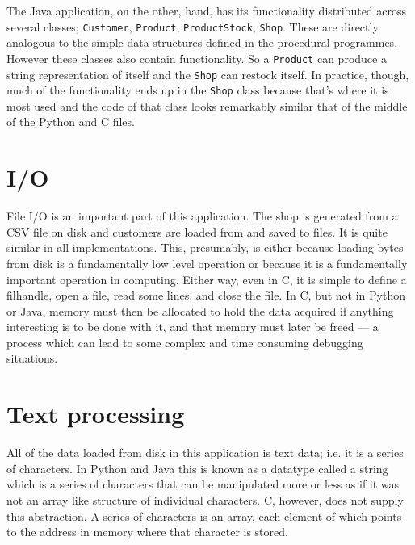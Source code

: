 \documentclass[12pt, a4paper]{article}
\begin{document}
The Java application, on the other, hand, has its functionality distributed across several classes; \texttt{Customer}, \texttt{Product}, \texttt{ProductStock}, \texttt{Shop}. These are directly analogous to the simple data structures defined in the procedural programmes. However these classes also contain functionality. So a \texttt{Product} can produce a string representation of itself and the \texttt{Shop} can restock itself. In practice, though, much of the functionality ends up in the \texttt{Shop} class because that's where it is most used and the code of that class looks remarkably similar that of the middle of the Python and C files.

\section{I/O}

File I/O is an important part of this application. The shop is generated from a CSV file on disk and customers are loaded from and saved to files. It is quite similar in all implementations. This, presumably, is either because loading bytes from disk is a fundamentally low level operation or because it is a fundamentally important operation in computing. Either way, even in C, it is simple to define a filhandle, open a file, read some lines, and close the file. In C, but not in Python or Java, memory must then be allocated to hold the data acquired if anything interesting is to be done with it, and that memory must later be freed --- a process which can lead to some complex and time consuming debugging situations.

\section{Text processing}

All of the data loaded from disk in this application is text data; i.e. it is a series of characters. In Python and Java this is known as a datatype called a string which is a series of characters that can be manipulated more or less as if it was not an array like structure of individual characters. C, however, does not supply this abstraction. A series of characters is an array, each element of which points to the address in memory where that character is stored.  

\clearpage
\end{document}
